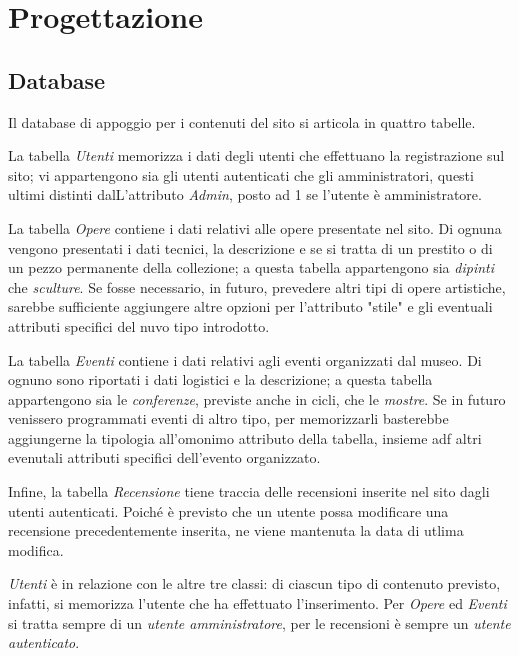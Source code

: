 \section{Progettazione}
\label{progettazione}

\subsection{Database}
\label{progettazione-database}
Il database di appoggio per i contenuti del sito si articola in quattro tabelle. 

La tabella \textit{Utenti} memorizza i dati degli utenti che effettuano la registrazione sul sito; vi appartengono sia gli utenti autenticati che gli amministratori, questi ultimi distinti dalL'attributo \textit{Admin}, posto ad 1 se l'utente è amministratore.

La tabella \textit{Opere} contiene i dati relativi alle opere presentate nel sito. Di ognuna vengono presentati i dati tecnici, la descrizione e se si tratta di un prestito o di un pezzo permanente della collezione; a questa tabella appartengono sia \textit{dipinti} che \textit{sculture}. Se fosse necessario, in futuro, prevedere altri tipi di opere artistiche, sarebbe sufficiente aggiungere altre opzioni per l'attributo "stile" e gli eventuali attributi specifici del nuvo tipo introdotto.

La tabella \textit{Eventi} contiene i dati relativi agli eventi organizzati dal museo. Di ognuno sono riportati i dati logistici e la descrizione; a questa tabella appartengono sia le \textit{conferenze}, previste anche in cicli, che le \textit{mostre}. Se in futuro venissero programmati eventi di altro tipo, per memorizzarli basterebbe aggiungerne la tipologia all'omonimo attributo della tabella, insieme adf altri evenutali attributi specifici dell'evento organizzato.

Infine, la tabella \textit{Recensione} tiene traccia delle recensioni inserite nel sito dagli utenti autenticati. Poiché è previsto che un utente possa modificare una recensione precedentemente inserita, ne viene mantenuta la data di utlima modifica.

\textit{Utenti} è in relazione con le altre tre classi: di ciascun tipo di contenuto previsto, infatti, si memorizza l'utente che ha effettuato l'inserimento. Per \textit{Opere} ed \textit{Eventi} si tratta sempre di un \textit{utente amministratore}, per le recensioni è sempre un \textit{utente autenticato}.

